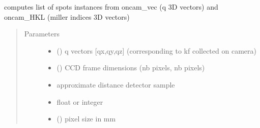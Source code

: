 \documentclass[letterpaper,10pt,english]{sphinxmanual}
\begin{document}
\begin{fulllineitems}
\label{\detokenize{Simulation_Module:LaueTools.lauecore.get2ThetaChi_geometry}}
computes list of spots instances from oncam\_vec (q 3D vectors)
and oncam\_HKL (miller indices 3D vectors)
\begin{quote}\begin{description}
\item[{Parameters}] \leavevmode\begin{itemize}
\item {} 
 (\sphinxstyleliteralemphasis{\sphinxupquote{ (}}\sphinxstyleliteralemphasis{\sphinxupquote{ (}}\sphinxstyleliteralemphasis{\sphinxupquote{,}}\sphinxstyleliteralemphasis{\sphinxupquote{)}}\sphinxstyleliteralemphasis{\sphinxupquote{)}}) \textendash{} q vectors {[}qx,qy,qz{]} (corresponding to kf collected on camera)

\item {} 
 () \textendash{} CCD frame dimensions (nb pixels, nb pixels)

\item {} 
 \textendash{} approximate distance detector sample

\item {} 
 \textendash{} float or integer

\item {} 
 () \textendash{} pixel size in mm

\end{itemize}


\end{description}
\end{quote}
\end{fulllineitems}
\end{document}
